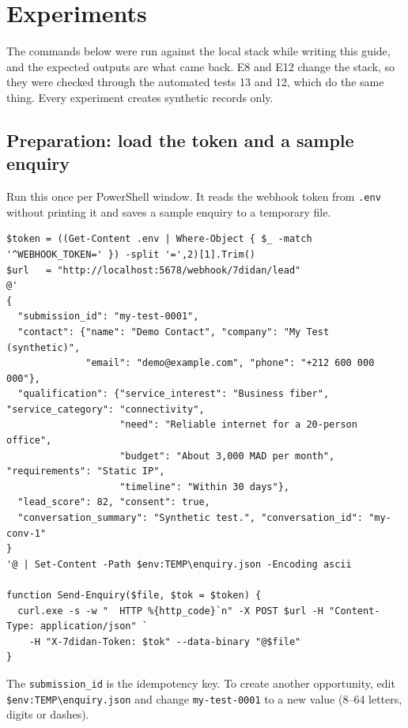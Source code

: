 \documentclass[11pt,a4paper]{article}
\newcommand{\f}[1]{\texttt{#1}}
\begin{document}
\section{Experiments}

The commands below were run against the local stack while writing this guide, and the expected
outputs are what came back. E8 and E12 change the stack, so they were checked through the
automated tests 13 and 12, which do the same thing. Every experiment creates synthetic records only.

\subsection*{Preparation: load the token and a sample enquiry}

Run this once per PowerShell window. It reads the webhook token from \f{.env} without printing it
and saves a sample enquiry to a temporary file.

\begin{lstlisting}
$token = ((Get-Content .env | Where-Object { $_ -match '^WEBHOOK_TOKEN=' }) -split '=',2)[1].Trim()
$url   = "http://localhost:5678/webhook/7didan/lead"
@'
{
  "submission_id": "my-test-0001",
  "contact": {"name": "Demo Contact", "company": "My Test (synthetic)",
              "email": "demo@example.com", "phone": "+212 600 000 000"},
  "qualification": {"service_interest": "Business fiber", "service_category": "connectivity",
                    "need": "Reliable internet for a 20-person office",
                    "budget": "About 3,000 MAD per month", "requirements": "Static IP",
                    "timeline": "Within 30 days"},
  "lead_score": 82, "consent": true,
  "conversation_summary": "Synthetic test.", "conversation_id": "my-conv-1"
}
'@ | Set-Content -Path $env:TEMP\enquiry.json -Encoding ascii

function Send-Enquiry($file, $tok = $token) {
  curl.exe -s -w "  HTTP %{http_code}`n" -X POST $url -H "Content-Type: application/json" `
    -H "X-7didan-Token: $tok" --data-binary "@$file"
}
\end{lstlisting}

\begin{note}
The \f{submission\_id} is the idempotency key. To create another opportunity, edit
\f{\$env:TEMP\textbackslash enquiry.json} and change \f{my-test-0001} to a new value (8--64 letters,
digits or dashes).
\end{note}
\end{document}
